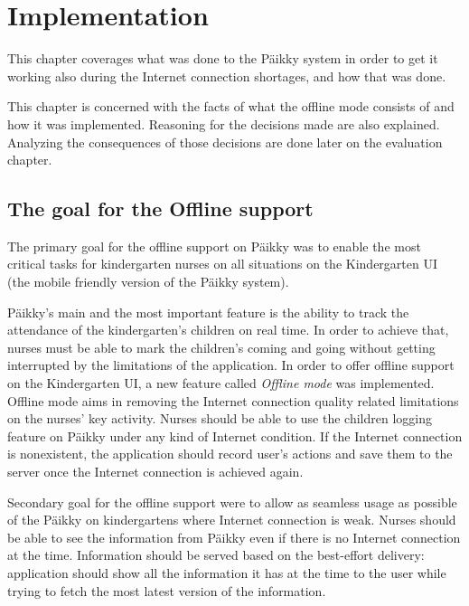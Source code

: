 
\chapter{Implementation}
This chapter coverages what was done to the Päikky system in order to get it working also during the Internet connection shortages, and how that was done. 

This chapter is concerned with the facts of what the offline mode consists of and how it was implemented. Reasoning for the decisions made are also explained. Analyzing the consequences of those decisions are done later on the evaluation chapter.

\section{The goal for the Offline support}


The primary goal for the offline support on Päikky was to enable the most critical tasks for kindergarten nurses on all situations on the Kindergarten UI (the mobile friendly version of the Päikky system). 

Päikky's main and the most important feature is the ability to track the attendance of the kindergarten's children on real time. In order to achieve that, nurses must be able to mark the children's coming and going without getting interrupted by the limitations of the application. In order to offer offline support on the Kindergarten UI, a new feature called \textit{Offline mode} was implemented. Offline mode aims in removing the Internet connection quality related limitations on the nurses' key activity. Nurses should be able to use the children logging feature on Päikky under any kind of Internet condition. If the Internet connection is nonexistent, the application should record user's actions and save them to the server once the Internet connection is achieved again.

Secondary goal for the offline support were to allow as seamless usage as possible of the Päikky on kindergartens where Internet connection is weak. Nurses should be able to see the information from Päikky even if there is no Internet connection at the time. Information should be served based on the best-effort delivery: application should show all the information it has at the time to the user while trying to fetch the most latest version of the information.


